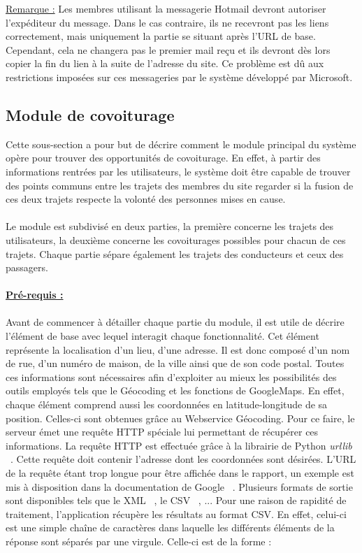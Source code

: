 \documentclass[12pt, a4paper, oneside]{article}
\begin{document}
     \underline{Remarque :} Les membres utilisant la messagerie Hotmail devront autoriser l'expéditeur du message. Dans le cas contraire, ils ne recevront pas les liens correctement, mais uniquement la partie se situant après l'URL de base. Cependant, cela ne changera pas le premier mail reçu et ils devront dès lors copier la fin du lien à la suite de l'adresse du site. Ce problème est dû aux restrictions imposées sur ces messageries par le système développé par Microsoft.\\
     
\subsection{Module de covoiturage} \label{covoiturage}
    Cette sous-section a pour but de décrire comment le module principal du système opère pour trouver des opportunités de covoiturage. En effet, à partir des informations rentrées par les utilisateurs, le système doit être capable de trouver des points communs entre les trajets des membres du site regarder si la fusion de ces deux trajets respecte la volonté des personnes mises en cause.\\\\
    \indent Le module est subdivisé en deux parties, la première concerne les trajets des utilisateurs, la deuxième concerne les covoiturages possibles pour chacun de ces trajets. Chaque partie sépare également les trajets des conducteurs et ceux des passagers.\\\\
    \underline{\textbf{Pré-requis :}}\\\\
    \indent Avant de commencer à détailler chaque partie du module, il est utile de décrire l'élément de base avec lequel interagit chaque fonctionnalité. Cet élément représente la localisation d'un lieu, d'une adresse. Il est donc composé d'un nom de rue, d'un numéro de maison, de la ville ainsi que de son code postal. Toutes ces informations sont nécessaires afin d'exploiter au mieux les possibilités des outils employés tels que le Géocoding et les fonctions de GoogleMaps. En effet, chaque élément comprend aussi les coordonnées en latitude-longitude de sa position. Celles-ci sont obtenues grâce au Webservice Géocoding. Pour ce faire, le serveur émet une requête HTTP spéciale lui permettant de récupérer ces informations. La requête HTTP est effectuée grâce à la librairie de Python \textit{urllib} ~\cite{py-urllib}. Cette requête doit contenir l'adresse dont les coordonnées sont désirées. L'URL de la requête étant trop longue pour être affichée dans le rapport, un exemple est mis à disposition dans la documentation de Google ~\cite{google-geodoc}. Plusieurs formats de sortie sont disponibles tels que le XML ~\cite{XML}, le CSV ~\cite{CSV}, ... Pour une raison de rapidité de traitement, l'application récupère les résultats au format CSV. En effet, celui-ci est une simple chaîne de caractères dans laquelle les différents éléments de la réponse sont séparés par une virgule. Celle-ci est de la forme :
\end{document}
